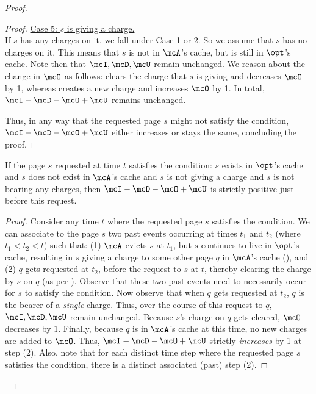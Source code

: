 \begin{proof}
\begin{proof}
        \medskip
        \noindent\underline{Case 5: $s$ is giving a charge.} \\
        If $s$ has any charges on it, we fall under Case 1 or 2. So we assume that $s$ has no charges on it. This means that $s$ is not in $\mcA$'s cache, but is still in $\opt$'s cache. Note then that $\mcI, \mcD, \mcU$ remain unchanged. We reason about the change in $\mcO$ as follows:  clears the charge that $s$ is giving and decreases $\mcO$ by 1, whereas  creates a new charge and increases $\mcO$ by 1. In total, $\mcI-\mcD-\mcO+\mcU$ remains unchanged.

        Thus, in any way that the requested page $s$ might not satisfy the condition, $\mcI-\mcD-\mcO+\mcU$ either increases or stays the same, concluding the proof.
    \end{proof}

    \begin{claim}
        If the page $s$ requested at time $t$ satisfies the condition: $s$ exists in $\opt$'s cache and $s$ does not exist in $\mcA$'s cache and $s$ is not giving a charge and $s$ is not bearing any charges, then $\mcI-\mcD-\mcO+\mcU$ is strictly positive just before this request.
    \end{claim}
    \begin{proof}
        Consider any time $t$ where the requested page $s$ satisfies the condition. We can associate to the page $s$ two past events occurring at times $t_1$ and $t_2$ (where $t_1 < t_2 < t$) such that: (1) $\mcA$ evicts $s$ at $t_1$, but $s$ continues to live in $\opt$'s cache, resulting in $s$ giving a charge to some other page $q$ in $\mcA$'s cache (), and (2) $q$ gets requested at $t_2$, before the request to $s$ at $t$, thereby clearing the charge by $s$ on $q$ (as per ). Observe that these two past events need to necessarily occur for $s$ to satisfy the condition. Now observe that when $q$ gets requested at $t_2$, $q$ is the bearer of a \textit{single} charge. Thus, over the course of this request to $q$, $\mcI, \mcD, \mcU$ remain unchanged. Because $s$'s charge on $q$ gets cleared, $\mcO$ decreases by $1$. Finally, because $q$ is in $\mcA$'s cache at this time, no new charges are added to $\mcO$. Thus, $\mcI - \mcD - \mcO + \mcU$ strictly \textit{increases} by 1 at step (2). Also, note that for each distinct time step where the requested page $s$ satisfies the condition, there is a distinct associated (past) step (2).
              



\end{proof}
\end{proof}
